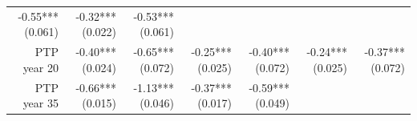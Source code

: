 \documentclass[]{article}
\begin{document}
\begin{longtable}[c]{@{}rrrrrrr@{}}
\begin{minipage}[t]{0.12\columnwidth}\raggedleft\strut
-0.55*** (0.061)
\strut\end{minipage} &
\begin{minipage}[t]{0.11\columnwidth}\raggedleft\strut
-0.32*** (0.022)
\strut\end{minipage} &
\begin{minipage}[t]{0.11\columnwidth}\raggedleft\strut
-0.53*** (0.061)
\strut\end{minipage}\tabularnewline
\begin{minipage}[t]{0.12\columnwidth}\raggedleft\strut
PTP year 20
\strut\end{minipage} &
\begin{minipage}[t]{0.11\columnwidth}\raggedleft\strut
-0.40*** (0.024)
\strut\end{minipage} &
\begin{minipage}[t]{0.12\columnwidth}\raggedleft\strut
-0.65*** (0.072)
\strut\end{minipage} &
\begin{minipage}[t]{0.11\columnwidth}\raggedleft\strut
-0.25*** (0.025)
\strut\end{minipage} &
\begin{minipage}[t]{0.12\columnwidth}\raggedleft\strut
-0.40*** (0.072)
\strut\end{minipage} &
\begin{minipage}[t]{0.11\columnwidth}\raggedleft\strut
-0.24*** (0.025)
\strut\end{minipage} &
\begin{minipage}[t]{0.11\columnwidth}\raggedleft\strut
-0.37*** (0.072)
\strut\end{minipage}\tabularnewline
\begin{minipage}[t]{0.12\columnwidth}\raggedleft\strut
PTP year 35
\strut\end{minipage} &
\begin{minipage}[t]{0.11\columnwidth}\raggedleft\strut
-0.66*** (0.015)
\strut\end{minipage} &
\begin{minipage}[t]{0.12\columnwidth}\raggedleft\strut
-1.13*** (0.046)
\strut\end{minipage} &
\begin{minipage}[t]{0.11\columnwidth}\raggedleft\strut
-0.37*** (0.017)
\strut\end{minipage} &
\begin{minipage}[t]{0.12\columnwidth}\raggedleft\strut
-0.59*** (0.049)
\strut\end{minipage} &

\end{longtable}
\end{document}
